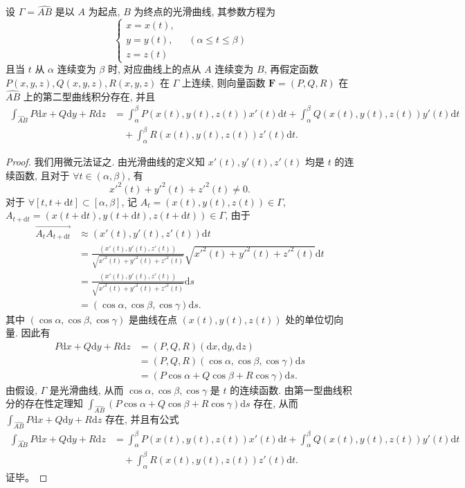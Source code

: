 \documentclass[12pt,fontset=fandol]{ctexart}
\begin{document}
\begin{theorem}\label{course-theorem-16-2-1}\quad 设 $\Gamma=\widehat{AB}$ 是以 $A$ 为起点, $B$ 为终点的光滑曲线, 其参数方程为
\[
  \begin{cases}
    x=x(t),\\
    y=y(t),\\
    z=z(t)
  \end{cases}
  \quad(\alpha\leqslant t\leqslant \beta)
\]
且当 $t$ 从 $\alpha$ 连续变为 $\beta$ 时, 对应曲线上的点从 $A$ 连续变为 $B$, 再假定函数\allowbreak $P(x,y,z),Q(x,y,z),R(x,y,z)$ 在 $\Gamma$ 上连续, 则向量函数 $\boldsymbol F=(P,Q,R)$ 在 $\widehat{AB}$ 上的第二型曲线积分存在, 并且
\[
\begin{aligned}
  \int_{\widehat{AB}}P\mathrm dx+Q\mathrm dy+R\mathrm dz
  &=\int_\alpha^\beta P(x(t),y(t),z(t))x'(t)\mathrm dt
    +\int_\alpha^\beta Q(x(t),y(t),z(t))y'(t)\mathrm dt\\
  &\quad+\int_\alpha^\beta R(x(t),y(t),z(t))z'(t)\mathrm dt.
\end{aligned}
\]

\end{theorem}
\begin{proof}\quad 我们用微元法证之. 由光滑曲线的定义知 $x'(t),y'(t),z'(t)$ 均是 $t$ 的连续函数, 且对于 $\forall t\in(\alpha,\beta)$, 有
\[
  x'^2(t)+y'^2(t)+z'^2(t)\ne0.
\]
对于 $\forall[t,t+\mathrm dt]\subset[\alpha,\beta]$, 记 $A_t=(x(t),y(t),z(t))\in\Gamma$, $A_{t+\mathrm dt}=(x(t+\mathrm dt),y(t+\mathrm dt),z(t+\mathrm dt))\in\Gamma$, 由于
\[
\begin{aligned}
  \overrightarrow{A_tA_{t+\mathrm dt}}
  &\approx (x'(t),y'(t),z'(t))\mathrm dt\\
  &=\frac{(x'(t),y'(t),z'(t))}
    {\sqrt{x'^2(t)+y'^2(t)+z'^2(t)}}
    \sqrt{x'^2(t)+y'^2(t)+z'^2(t)}\mathrm dt\\
  &=\frac{(x'(t),y'(t),z'(t))}
    {\sqrt{x'^2(t)+y'^2(t)+z'^2(t)}}\mathrm ds\\
  &=(\cos\alpha,\cos\beta,\cos\gamma)\mathrm ds.
\end{aligned}
\]
其中 $(\cos\alpha,\cos\beta,\cos\gamma)$ 是曲线在点 $(x(t),y(t),z(t))$ 处的单位切向量. 因此有
\[
\begin{aligned}
  P\mathrm dx+Q\mathrm dy+R\mathrm dz
  &=(P,Q,R)(\mathrm dx,\mathrm dy,\mathrm dz)\\
  &=(P,Q,R)(\cos\alpha,\cos\beta,\cos\gamma)\mathrm ds\\
  &=(P\cos\alpha+Q\cos\beta+R\cos\gamma)\mathrm ds.
\end{aligned}
\]
由假设, $\Gamma$ 是光滑曲线, 从而 $\cos\alpha,\cos\beta,\cos\gamma$ 是 $t$ 的连续函数. 由第一型曲线积分的存在性定理知 $\int_{\widehat{AB}}(P\cos\alpha+Q\cos\beta+R\cos\gamma)\mathrm ds$ 存在, 从而 $\int_{\widehat{AB}}P\mathrm dx+Q\mathrm dy+R\mathrm dz$ 存在, 并且有公式
\[
\begin{aligned}
  \int_{\widehat{AB}}P\mathrm dx+Q\mathrm dy+R\mathrm dz
  &=\int_\alpha^\beta P(x(t),y(t),z(t))x'(t)\mathrm dt
    +\int_\alpha^\beta Q(x(t),y(t),z(t))y'(t)\mathrm dt\\
  &\quad+\int_\alpha^\beta R(x(t),y(t),z(t))z'(t)\mathrm dt.
\end{aligned}
\]
证毕。

\end{proof}
\end{document}
